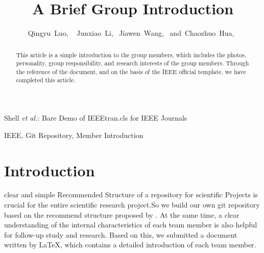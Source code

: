 \documentclass[journal]{IEEEtran}
\begin{document}
\title{A Brief Group Introduction}


\author{Qingyu~Luo, ~
        Junxiao~Li,~
        Jiawen~Wang,~
        and~Chaozhuo~Hua,~%
}


%
{Shell \MakeLowercase{\textit{et al.}}: Bare Demo of IEEEtran.cls for IEEE Journals}




\maketitle

\begin{abstract}
	This article is a simple introduction to the group members, which includes the photos, personality, group responsibility, and research interests of the group members. Through the reference of the document, and on the basis of the IEEE official template, we have completed this article.
\end{abstract}

\begin{IEEEkeywords}
IEEE, Git Repository, Member Introduction
\end{IEEEkeywords}




\IEEEpeerreviewmaketitle



\section{Introduction}

 clear and simple Recommended Structure of a repository for scientific Projects is crucial for the entire scientific research project.So we build our own git repository based on the recommend structure proposed by \citet{2020A}.
At the same time, a clear understanding of the internal characteristics of each team member is also helpful for follow-up study and research. 
Based on this, we submitted a document written by \LaTeX, which contains a detailed introduction of each team member.
\end{document}
